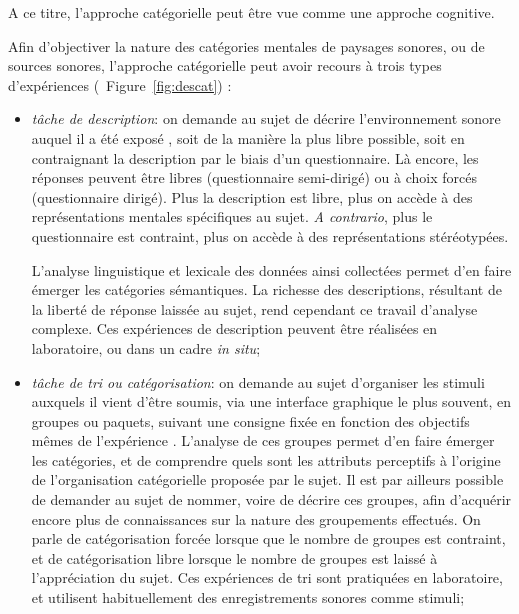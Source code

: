 A ce titre, l'approche catégorielle peut être vue comme une approche cognitive. 

Afin d'objectiver la nature des catégories mentales de paysages sonores, ou de sources sonores, l'approche catégorielle peut avoir recours à trois types d'expériences (\cf~Figure~\ref{fig:descat}) :

\begin{itemize}
\item \emph{tâche de description}: on demande au sujet de décrire l'environnement sonore auquel il a été exposé \citep{axelsson2005soundscape,raimbault2005urban,guastavino2006ideal,raimbault2006qualitative}, soit de la manière la plus libre possible, soit en contraignant la description par le biais d'un questionnaire. Là encore, les réponses peuvent être libres (questionnaire semi-dirigé) ou à choix forcés (questionnaire dirigé). Plus la description est libre, plus on accède à des représentations mentales spécifiques au sujet. \emph{A contrario}, plus le questionnaire est contraint, plus on accède à des représentations stéréotypées. 

L'analyse linguistique et lexicale des données ainsi collectées permet d'en faire émerger les catégories sémantiques. La richesse des descriptions, résultant de la liberté de réponse laissée au sujet, rend cependant ce travail d'analyse complexe. Ces expériences de description peuvent être réalisées en laboratoire, ou dans un cadre \emph{in situ};

\item \emph{tâche de tri ou catégorisation}: on demande au sujet d'organiser les stimuli auxquels il vient d'être soumis, via une interface graphique le plus souvent, en groupes ou paquets, suivant une consigne fixée en fonction des objectifs mêmes de l'expérience \citep{maffiolo_caracterisation_1999,guastavino2007categorization}. L'analyse de ces groupes permet d'en faire émerger les catégories, et de comprendre quels sont les attributs perceptifs à l'origine de l'organisation catégorielle proposée par le sujet. Il est par ailleurs possible de demander au sujet de nommer, voire de décrire ces groupes, afin d'acquérir encore plus de connaissances sur la nature des groupements effectués. On parle de catégorisation forcée lorsque que le nombre de groupes est contraint, et de catégorisation libre lorsque le nombre de groupes est laissé à l'appréciation du sujet. Ces expériences de tri sont pratiquées en laboratoire, et utilisent habituellement des enregistrements sonores comme stimuli;


\end{itemize}
